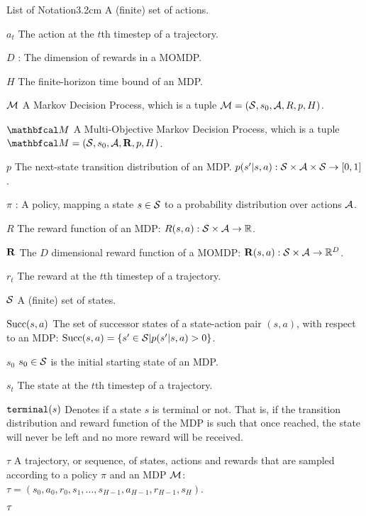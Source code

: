 \begin{mclistof}{List of Notation}{3.2cm}
        A (finite) set of actions.
    \item[$a_t$]
        The action at the $t$th timestep of a trajectory.
    \item[$D$]:
        The dimension of rewards in a MOMDP.
    \item[$H$]
        The finite-horizon time bound of an MDP.
    \item[$\mathcal{M}$]
        A Markov Decision Process, which is a tuple $\mathcal{M}=(\mathcal{S},s_0,\mathcal{A},R,p,H)$.
    \item[$\bfcl{M}$] 
        A Multi-Objective Markov Decision Process, which is a tuple $\bfcl{M}=(\cl{S},s_0,\cl{A},\bff{R},p,H)$.
    \item[$p$] 
        The next-state transition distribution of an MDP.  $p(s' | s,a) : \mathcal{S} \times \mathcal{A} \times \mathcal{S} \rightarrow [0,1]$.
    \item[$\pi$]:
        A policy, mapping a state $s\in\mathcal{S}$ to a probability distribution over actions $\mathcal{A}$.
    \item[$R$] 
        The reward function of an MDP: $R(s,a) : \mathcal{S}\times \mathcal{A}\rightarrow \mathbb{R}$.
    \item[$\mathbf{R}$] 
        The $D$ dimensional reward function of a MOMDP: $\mathbf{R}(s,a) : \mathcal{S}\times \mathcal{A}\rightarrow \mathbb{R}^D$.
    \item[$r_t$]
        The reward at the $t$th timestep of a trajectory.
    \item[$\mathcal{S}$]
        A (finite) set of states.
    \item[${\textnormal{Succ}(s,a)}$]
        The set of successor states of a state-action pair $(s,a)$, with respect to an MDP: ${\textnormal{Succ}(s,a)}=\{s'\in\mathcal{S}|p(s'|s,a)>0\}$.
    \item[$s_0$]
        $s_0\in\mathcal{S}$ is the initial starting state of an MDP.
    \item[$s_t$]
        The state at the $t$th timestep of a trajectory.
    \item[${\textnormal{\texttt{terminal}}}(s)$]
        Denotes if a state $s$ is terminal or not. That is, if the transition distribution and reward function of the MDP is such that once reached, the state will never be left and no more reward will be received.
    \item[$\tau$]
        A trajectory, or sequence, of states, actions and rewards that are sampled according to a policy $\pi$ and an MDP $\mathcal{M}$: $\tau = (s_0, a_0, r_0, s_1, ..., s_{H-1}, a_{H-1}, r_{H-1}, s_H)$.
    \item[$\mathbf{\tau}$]

\end{mclistof}

